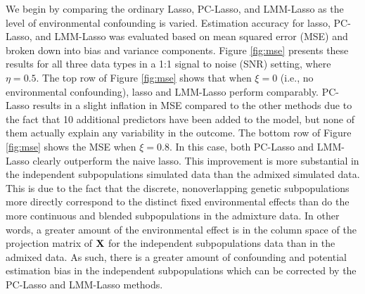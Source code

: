 We begin by comparing the ordinary Lasso, PC-Lasso, and LMM-Lasso as the level of environmental confounding is varied. Estimation accuracy for lasso, PC-Lasso, and LMM-Lasso was evaluated based on mean squared error (MSE) and broken down into bias and variance components. Figure \ref{fig:mse} presents these results for all three data types in a 1:1 signal to noise (SNR) setting, where $\eta = 0.5$. The top row of Figure \ref{fig:mse} shows that when $\xi = 0$ (i.e., no environmental confounding), lasso and LMM-Lasso perform comparably. PC-Lasso results in a slight inflation in MSE compared to the other methods due to the fact that 10 additional predictors have been added to the model, but none of them actually explain any variability in the outcome. The bottom row of Figure \ref{fig:mse} shows the MSE when $\xi = 0.8$. In this case, both PC-Lasso and LMM-Lasso clearly outperform the naive lasso. This improvement is more substantial in the independent subpopulations simulated data than the admixed simulated data.  This is due to the fact that the discrete, nonoverlapping genetic subpopulations more directly correspond to the distinct fixed environmental effects than do the more continuous and blended subpopulations in the admixture data. In other words, a greater amount of the environmental effect is in the column space of the projection matrix of $\textbf{X}$ for the independent subpopulations data than in the admixed data. As such, there is a greater amount of confounding and potential estimation bias in the independent subpopulations which can be corrected by the PC-Lasso and LMM-Lasso methods. 

